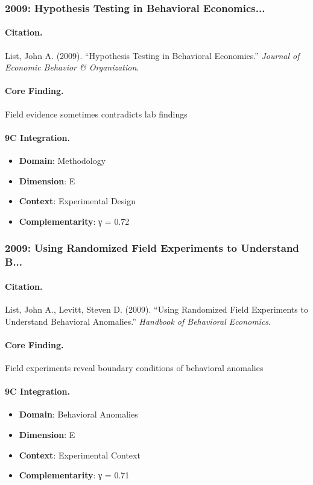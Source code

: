 \subsubsection{2009: Hypothesis Testing in Behavioral Economics...}

\paragraph{Citation.}
List, John A. (2009). ``Hypothesis Testing in Behavioral Economics.''
\textit{Journal of Economic Behavior & Organization}.

\paragraph{Core Finding.}
Field evidence sometimes contradicts lab findings

\paragraph{9C Integration.}
\begin{itemize}[nosep]
  \item \textbf{Domain}: Methodology
  \item \textbf{Dimension}: E
  \item \textbf{Context}: Experimental Design
  \item \textbf{Complementarity}: γ = 0.72
\end{itemize}


\subsubsection{2009: Using Randomized Field Experiments to Understand B...}

\paragraph{Citation.}
List, John A., Levitt, Steven D. (2009). ``Using Randomized Field Experiments to Understand Behavioral Anomalies.''
\textit{Handbook of Behavioral Economics}.

\paragraph{Core Finding.}
Field experiments reveal boundary conditions of behavioral anomalies

\paragraph{9C Integration.}
\begin{itemize}[nosep]
  \item \textbf{Domain}: Behavioral Anomalies
  \item \textbf{Dimension}: E
  \item \textbf{Context}: Experimental Context
  \item \textbf{Complementarity}: γ = 0.71
\end{itemize}


